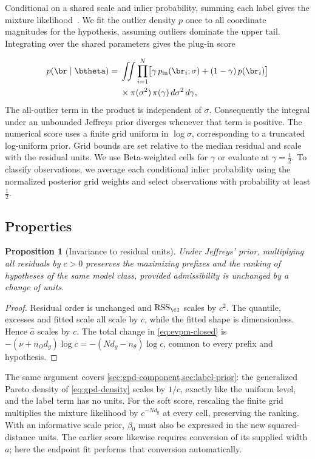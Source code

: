 \documentclass[10pt,twocolumn,letterpaper]{article}
\newtheorem{proposition}{Proposition}
\DeclareMathOperator{\RSS}{RSS}
\newcommand{\pin}{p_{\mathrm{in}}}
\newcommand{\ahat}{\hat a}
\begin{document}
Conditional on a shared scale and inlier probability, summing each
label gives the mixture likelihood~\cite{Torr2000}. We fit the
outlier density $p$ once to all coordinate magnitudes for the
hypothesis, assuming outliers dominate the upper tail.
Integrating over the shared parameters gives the plug-in score

\begin{equation}
 \begin{aligned}
 p(\br\mid\btheta)={}&\iint\prod_{i=1}^{N}
 \bigl[\gamma\,\pin(\br_i;\sigma)+(1-\gamma)\,p(\br_i)\bigr]\\
 &\times\pi(\sigma^2)\,\pi(\gamma)\,d\sigma^2\,d\gamma,
 \end{aligned}
 \label{eq:soft}
\end{equation}
The all-outlier term in the product is independent of $\sigma$.
Consequently the integral under an unbounded Jeffreys prior diverges
whenever that term is positive. The numerical score uses a finite grid
uniform in $\log\sigma$, corresponding to a truncated log-uniform prior.
Grid bounds are set relative to the median residual and scale with the
residual units. We use Beta-weighted cells for $\gamma$ or evaluate at
$\gamma=\tfrac12$. To classify observations, we average each conditional
inlier probability using the normalized posterior grid weights and
select observations with probability at least $\tfrac12$.

\subsection{Properties}
\label{sec:properties}

\begin{proposition}[Invariance to residual units]
\label{prop:invariance}
Under Jeffreys' prior, multiplying all residuals by $c>0$ preserves the
maximizing prefixes and the ranking of hypotheses of the same model class,
provided admissibility is unchanged by a change of units.
\end{proposition}
\begin{proof}
Residual order is unchanged and $\RSS_\cI$ scales by $c^2$.
The quantile, excesses and fitted scale all scale by $c$, while the
fitted shape is dimensionless. Hence $\ahat$ scales by $c$. The total
change in \cref{eq:evpm-closed} is
$-(\nu+n_Od_g)\log c=-(Nd_g-n_\theta)\log c$, common to every
prefix and hypothesis.
\end{proof}
The same argument covers \cref{sec:gpd-component,sec:label-prior}: the
generalized Pareto density of \cref{eq:gpd-density} scales by $1/c$,
exactly like the uniform level, and the label term has no units.
For the soft score, rescaling the finite grid multiplies the mixture likelihood by $c^{-Nd_g}$ at every cell, preserving the ranking. With an informative scale prior, $\beta_0$ must also be expressed in the new
squared-distance units. The earlier score likewise requires conversion
of its supplied width $a$; here the endpoint fit performs that
conversion automatically.
\end{document}
